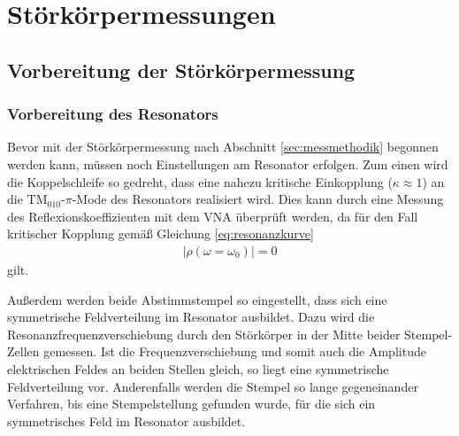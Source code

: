 \chapter{Störkörpermessungen}
\label{sec:stoerkoerpermessung}


\section{Vorbereitung der Störkörpermessung}

\subsection{Vorbereitung des Resonators}
\label{sec:vorbereitung_resonator}
Bevor mit der Störkörpermessung nach Abschnitt \ref{sec:messmethodik} begonnen werden kann, müssen noch Einstellungen am Resonator erfolgen.
Zum einen wird die Koppelschleife so gedreht, dass eine nahezu kritische Einkopplung ($\kappa \approx 1$) an die $\mathrm{TM}_{010}\text{-}\pi$-Mode des Resonators realisiert wird.
Dies kann durch eine Messung des Reflexionskoeffizienten mit dem VNA überprüft werden, da für den Fall kritischer Kopplung gemäß Gleichung \eqref{eq:resonanzkurve}
\begin{align}
	|\rho(\omega = \omega_0)| = 0
\end{align}
gilt.

Außerdem werden beide Abstimmstempel so eingestellt, dass sich eine symmetrische Feldverteilung im Resonator ausbildet.
Dazu wird die Resonanzfrequenzverschiebung durch den Störkörper in der Mitte beider Stempel-Zellen gemessen.
Ist die Frequenzverschiebung und somit auch die Amplitude elektrischen Feldes an beiden Stellen gleich, so liegt eine symmetrische Feldverteilung vor.
Anderenfalls werden die Stempel so lange gegeneinander Verfahren, bis eine Stempelstellung gefunden wurde, für die sich ein symmetrisches Feld im Resonator ausbildet.

